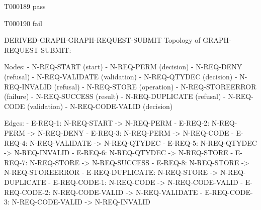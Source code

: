 \documentclass[11pt,a4paper]{article}
\begin{document}
\begin{atlastext}{T000189}
pass
\end{atlastext}
\begin{atlastext}{T000190}
fail
\end{atlastext}
\par\noindent\begin{minipage}{\linewidth}
\begin{atlasderived}{DERIVED-GRAPH-GRAPH-REQUEST-SUBMIT}
Topology of GRAPH-REQUEST-SUBMIT:

Nodes:
- N-REQ-START (start)
- N-REQ-PERM (decision)
- N-REQ-DENY (refusal)
- N-REQ-VALIDATE (validation)
- N-REQ-QTYDEC (decision)
- N-REQ-INVALID (refusal)
- N-REQ-STORE (operation)
- N-REQ-STOREERROR (failure)
- N-REQ-SUCCESS (result)
- N-REQ-DUPLICATE (refusal)
- N-REQ-CODE (validation)
- N-REQ-CODE-VALID (decision)

Edges:
- E-REQ-1: N-REQ-START -> N-REQ-PERM
- E-REQ-2: N-REQ-PERM -> N-REQ-DENY
- E-REQ-3: N-REQ-PERM -> N-REQ-CODE
- E-REQ-4: N-REQ-VALIDATE -> N-REQ-QTYDEC
- E-REQ-5: N-REQ-QTYDEC -> N-REQ-INVALID
- E-REQ-6: N-REQ-QTYDEC -> N-REQ-STORE
- E-REQ-7: N-REQ-STORE -> N-REQ-SUCCESS
- E-REQ-8: N-REQ-STORE -> N-REQ-STOREERROR
- E-REQ-DUPLICATE: N-REQ-STORE -> N-REQ-DUPLICATE
- E-REQ-CODE-1: N-REQ-CODE -> N-REQ-CODE-VALID
- E-REQ-CODE-2: N-REQ-CODE-VALID -> N-REQ-VALIDATE
- E-REQ-CODE-3: N-REQ-CODE-VALID -> N-REQ-INVALID
\end{atlasderived}
\end{minipage}\par
\clearpage
{}\par
\end{document}
